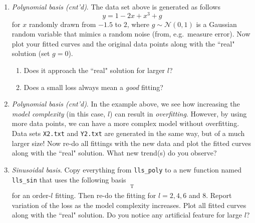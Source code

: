 \documentclass[a4paper,twoside, 10pt]{article}
\theoremstyle{wick}
\newcommand{\tr}{\textrm}
\newcommand{\ttt}{\texttt}
\begin{document}
\begin{enumerate}
		\item \textit{Polynomial basis (cnt'd)}. The data set above is generated as follows
		\begin{equation}
			y
				= 1 - 2x + x^3 + g
		\end{equation}
		for $x$ randomly drawn from $-1.5$ to $2$, where $g \sim \mathcal{N}(0, 1)$ is a Gaussian random variable that mimics a random noise (from, e.g.\ measure error). Now plot your fitted curves and the original data points along with the ``real" solution (set $g = 0$).
		\begin{enumerate}
			\item Does it approach the ``real" solution for larger $l$?
			\item Does a small loss always mean a \emph{good} fitting?
		\end{enumerate}

		\item \textit{Polynomial basis (cnt'd)}. In the example above, we see how increasing the \emph{model complexity} (in this case, $l$) can result in \emph{overfitting}. However, by using more data points, we can have a more complex model without overfitting. Data sets \ttt{X2.txt} and \ttt{Y2.txt} are generated in the same way, but of a much larger size! Now re-do all fittings with the new data and plot the fitted curves along with the ``real" solution. What new trend(s) do you observe?

		\item \textit{Sinusoidal basis}. Copy everything from \ttt{lls\_poly} to a new function named \ttt{lls\_sin} that uses the following basis
		\begin{equation}
			[1, \sin x, \cos x, \cdots{}, \sin (l-1)x, \cos (l-1)x]^{\tr{T}}
		\end{equation}
		for an order-$l$ fitting. Then re-do the fitting for $l = 2, 4, 6$ and $8$. Report variation of the loss as the model complexity increases. Plot all fitted curves along with the ``real" solution. Do you notice any artificial feature for large $l$?
	\end{enumerate}
\end{document}
